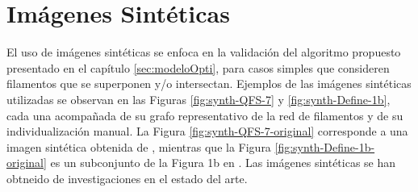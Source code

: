 \section{Im\'agenes Sint\'eticas}
\label{sec:SynthImgMethod}
El uso de im\'agenes sint\'eticas se enfoca en la validaci\'on del algoritmo propuesto presentado en el cap\'itulo \ref{sec:modeloOpti}, para casos simples que consideren filamentos que se superponen y/o intersectan. Ejemplos de las im\'agenes sint\'eticas utilizadas se observan en las Figuras \ref{fig:synth-QFS-7} y \ref{fig:synth-Define-1b}, cada una acompa\~nada de su grafo representativo de la red de filamentos y de su individualizaci\'on manual. La Figura \ref{fig:synth-QFS-7-original} corresponde a una imagen sint\'etica obtenida de \citet{qiu2014quantitative}, mientras que la Figura \ref{fig:synth-Define-1b-original} es un subconjunto de la Figura 1b  en \citet{breuer2015define}. Las im\'agenes sint\'eticas se han obtneido de investigaciones en el estado del arte.




